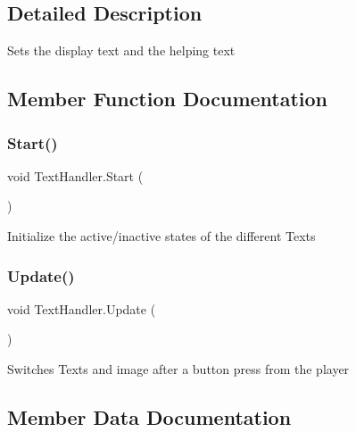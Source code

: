 \subsection{Detailed Description}
Sets the display text and the helping text 



\subsection{Member Function Documentation}
\mbox{\label{class_text_handler_a89acdf898a4c68246556a9d842d5f7bb}} 
\subsubsection{\texorpdfstring{Start()}{Start()}}
{\footnotesize\ttfamily void Text\+Handler.\+Start (\begin{DoxyParamCaption}{ }\end{DoxyParamCaption})\hspace{0.3cm}{\ttfamily [private]}}



Initialize the active/inactive states of the different Texts 

\mbox{\label{class_text_handler_af98485530413e928b4af25c1571c715a}} 
\subsubsection{\texorpdfstring{Update()}{Update()}}
{\footnotesize\ttfamily void Text\+Handler.\+Update (\begin{DoxyParamCaption}{ }\end{DoxyParamCaption})\hspace{0.3cm}{\ttfamily [private]}}



Switches Texts and image after a button press from the player 



\subsection{Member Data Documentation}
\mbox{\label{class_text_handler_a0fe6e79c5dcffb531a1049c23e51744c}} 
